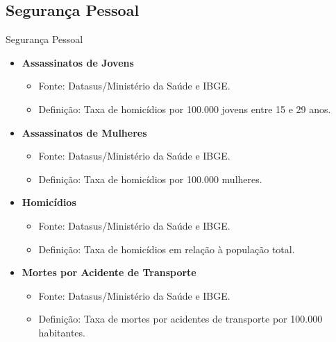 \documentclass{beamer}
\begin{document}
\subsection{Segurança Pessoal}
\begin{frame}{Segurança Pessoal}
\begin{itemize}
    \item \textbf{Assassinatos de Jovens}
    \begin{itemize}
        \item Fonte: Datasus/Ministério da Saúde e IBGE.
        \item Definição: Taxa de homicídios por 100.000 jovens entre 15 e 29 anos.
    \end{itemize}
    \item \textbf{Assassinatos de Mulheres}
    \begin{itemize}
        \item Fonte: Datasus/Ministério da Saúde e IBGE.
        \item Definição: Taxa de homicídios por 100.000 mulheres.
    \end{itemize}
    \item \textbf{Homicídios}
    \begin{itemize}
        \item Fonte: Datasus/Ministério da Saúde e IBGE.
        \item Definição: Taxa de homicídios em relação à população total.
    \end{itemize}
    \item \textbf{Mortes por Acidente de Transporte}
    \begin{itemize}
        \item Fonte: Datasus/Ministério da Saúde e IBGE.
        \item Definição: Taxa de mortes por acidentes de transporte por 100.000 habitantes.
    \end{itemize}
\end{itemize}
\end{frame}
\end{document}

